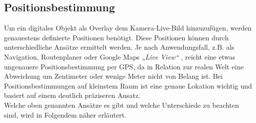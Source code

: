 \subsection{Positionsbestimmung}
\label{sec:posi}
Um ein digitales Objekt als Overlay dem Kamera-Live-Bild hinzuzufügen, werden genauestens definierte Positionen benötigt. Diese Positionen 
können durch unterschiedliche Ansätze ermittelt werden. Je nach Anwendungsfall, z.B. als Navigation, Routenplaner oder Google Maps 
\textit{„Live View“} \cite{googleliveview.2019a}, reicht eine etwas ungenauere Positionsbestimmung per \acs{GPS}, da in Relation zur 
realen Welt eine Abweichung um Zentimeter oder wenige Meter nicht von Belang ist. Bei Positionsbestimmungen auf kleinstem Raum ist eine 
genaue Lokation wichtig und basiert auf einem deutlich präziseren Ansatz. 
\\ 
Welche oben genannten Ansätze es gibt und welche Unterschiede zu beachten sind, wird in Folgendem näher erläutert. 
